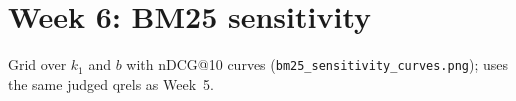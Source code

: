 \section{Week 6: BM25 sensitivity}
Grid over $k_1$ and $b$ with nDCG@10 curves (\texttt{bm25\_sensitivity\_curves.png}); uses the same judged qrels as Week~5.
